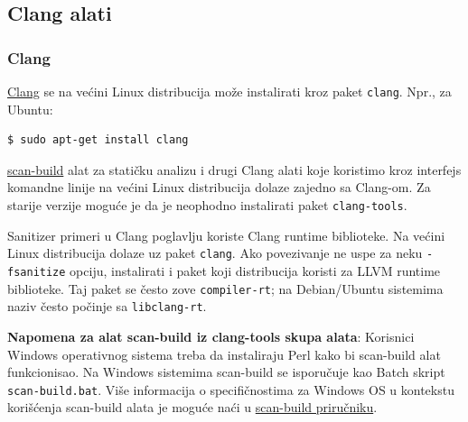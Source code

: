 \subsection{Clang alati}\label{instalacija-clang-alati}

\subsubsection{Clang}\label{clang}

\href{https://clang.llvm.org/docs/UsersManual.html}{Clang} se na većini Linux distribucija može instalirati kroz paket \texttt{clang}. Npr., za Ubuntu:

\begin{verbatim}
$ sudo apt-get install clang
\end{verbatim}

\href{https://clang-analyzer.llvm.org/scan-build.html}{scan-build} alat za statičku analizu i drugi Clang alati koje koristimo kroz interfejs komandne linije na većini Linux distribucija dolaze zajedno sa Clang-om. Za starije verzije moguće je da je neophodno instalirati paket \texttt{clang-tools}.

Sanitizer primeri u Clang poglavlju koriste Clang runtime biblioteke. Na većini Linux distribucija dolaze uz paket \texttt{clang}. Ako povezivanje ne uspe za neku \texttt{-fsanitize} opciju, instalirati i paket koji distribucija koristi za LLVM runtime biblioteke. Taj paket se često zove \texttt{compiler-rt}; na Debian/Ubuntu sistemima naziv često počinje sa \texttt{libclang-rt}.

\textbf{Napomena za alat scan-build iz clang-tools skupa alata}: Korisnici Windows operativnog sistema treba da instaliraju Perl kako bi scan-build alat funkcionisao. Na Windows sistemima scan-build se isporučuje kao Batch skript \texttt{scan-build.bat}. Više informacija o specifičnostima za Windows OS u kontekstu korišćenja scan-build alata je moguće naći u \href{https://clang-analyzer.llvm.org/scan-build.html}{scan-build priručniku}.
